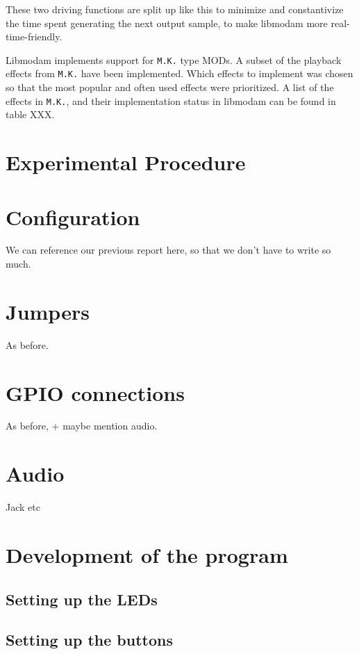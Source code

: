 These two driving functions are split up like this to minimize and constantivize the time spent generating the next output sample, to make libmodam more real-time-friendly.

Libmodam implements support for \texttt{M.K.} type MODs.
A subset of the playback effects from \texttt{M.K.} have been implemented.
Which effects to implement was chosen so that the most popular and often used effects were prioritized.
A list of the effects in \texttt{M.K.}, and their implementation status in libmodam can be found in table XXX.


\section{Experimental Procedure}


\section{Configuration}

We can reference our previous report here, so that we don't have to write so much.

\section{Jumpers}

As before.

\section{GPIO connections}

As before, + maybe mention audio.

\section{Audio}

Jack etc

\section{Development of the program}


\subsection{Setting up the LEDs}
\subsection{Setting up the buttons}
